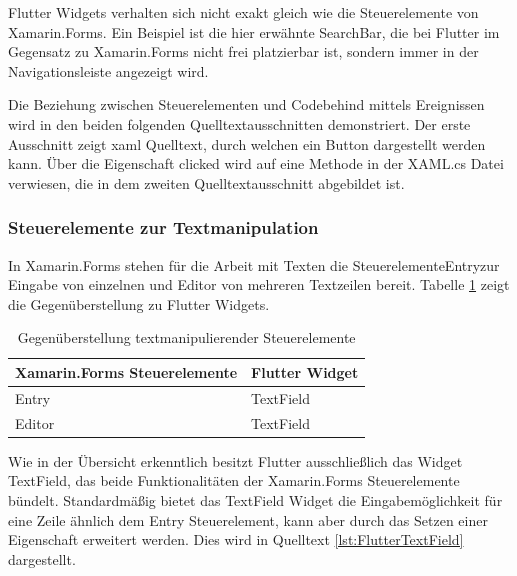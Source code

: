Flutter Widgets verhalten sich nicht exakt gleich wie die Steuerelemente von Xamarin.Forms.  Ein Beispiel ist die hier erwähnte SearchBar, die bei Flutter im Gegensatz zu Xamarin.Forms nicht frei platzierbar ist, sondern immer in der Navigationsleiste angezeigt wird. 

Die Beziehung zwischen Steuerelementen und Codebehind mittels Ereignissen wird  in den beiden folgenden Quelltextausschnitten demonstriert.  Der erste Ausschnitt zeigt  \ac{xaml} Quelltext,  durch welchen ein Button dargestellt werden kann.  Über die Eigenschaft clicked wird auf eine Methode in der XAML.cs Datei verwiesen,  die in dem zweiten Quelltextausschnitt abgebildet ist. 





\subsubsection{Steuerelemente zur Textmanipulation}
In Xamarin.Forms stehen für die Arbeit mit Texten die Steuerelemente\glq Entry\grq{}zur  Eingabe von einzelnen und  \glq Editor\grq{} von mehreren Textzeilen bereit.  Tabelle \ref{tab:TextWidgets} zeigt die Gegenüberstellung zu Flutter Widgets.  

\begin{table}[!ht]
\begin{tabularx}{\textwidth}{X|X}
   \textbf{Xamarin.Forms Steuerelemente} & \textbf{Flutter Widget}  \\
\hline
	Entry		       		&  TextField	 		\\ 
	Editor		       	&  TextField	 		\\ 
\end{tabularx}
\caption{Gegenüberstellung textmanipulierender Steuerelemente}
 \label{tab:TextWidgets}
\end{table}
Wie in der Übersicht erkenntlich besitzt Flutter ausschließlich das Widget \glq TextField\grq{},  das beide Funktionalitäten der Xamarin.Forms Steuerelemente bündelt.  Standardmäßig bietet das \glq TextField\grq{} Widget die Eingabemöglichkeit für eine Zeile ähnlich dem \glq Entry\grq{} Steuerelement, kann aber durch das Setzen einer Eigenschaft erweitert werden.  Dies wird in Quelltext \ref{lst:FlutterTextField} dargestellt.

